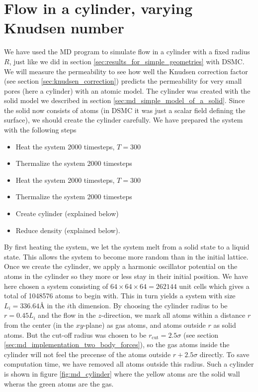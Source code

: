 \section{Flow in a cylinder, varying Knudsen number}
We have used the MD program to simulate flow in a cylinder with a fixed radius $R$, just like we did in section \ref{sec:results_for_simple_geometries} with DSMC. We will measure the permeability to see how well the Knudsen correction factor (see section \ref{sec:knudsen_correction}) predicts the permeability for very small pores (here a cylinder) with an atomic model. The cylinder was created with the solid model we described in section \ref{sec:md_simple_model_of_a_solid}. Since the solid now consists of atoms (in DSMC it was just a scalar field defining the surface), we should create the cylinder carefully. We have prepared the system with the following steps
\begin{itemize}
	\item Heat the system 2000 timesteps, $T=$\unit{300}{\kelvin}
	\item Thermalize the system 2000 timesteps
	\item Heat the system 2000 timesteps, $T=$\unit{300}{\kelvin}
	\item Thermalize the system 2000 timesteps
	\item Create cylinder (explained below)
	\item Reduce density (explained below).
\end{itemize}
By first heating the system, we let the system melt from a solid state to a liquid state. This allows the system to become more random than in the initial lattice. Once we create the cylinder, we apply a harmonic oscillator potential on the atoms in the cylinder so they more or less stay in their initial position. We have here chosen a system consisting of $64\times64\times64=262144$ unit cells which gives a total of 1048576 atoms to begin with. This in turn yields a system with size $L_i=336.64Å$ in the $i$th dimension. By choosing the cylinder radius to be $r=0.45L_i$ and the flow in the $z$-direction, we mark all atoms within a distance $r$ from the center (in the $xy$-plane) as gas atoms, and atoms outside $r$ as solid atoms. But the cut-off radius was chosen to be $r_\text{cut}=2.5\sigma$ (see section \ref{sec:md_implementation_two_body_forces}), so the gas atoms inside the cylinder will not feel the precense of the atoms outside $r+2.5\sigma$ directly. To save computation time, we have removed all atoms outside this radius. Such a cylinder is shown in figure \ref{fig:md_cylinder} where the yellow atoms are the solid wall wheras the green atoms are the gas.

